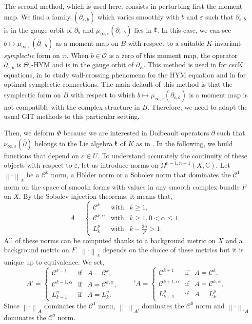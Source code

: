 \documentclass{article}
\theoremstyle{remark}
\theoremstyle{definition}
\newcommand{\C}{\mathbb{C}}
\newcommand{\norme}[1]{\left\| #1 \right\|}
\newcommand{\dbar}{\overline{\partial}}
\newcommand{\mC}{\mathcal{C}}
\renewcommand{\leq}{\leqslant}
\renewcommand{\geq}{\geqslant}
\begin{document}
The second method, which is used here, consists in perturbing first the moment map. We find a family $(\dbar_{\varepsilon,b})$ which varies smoothly with $b$ and $\varepsilon$ such that $\dbar_{\varepsilon,b}$ is in the gauge orbit of $\dbar_b$ and $\mu_{\infty,\varepsilon}(\dbar_{\varepsilon,b})$ lies in $\frak{k}$. In this case, we can see $b \mapsto \mu_{\infty,\varepsilon}(\dbar_{\varepsilon,b})$ as a moment map on $B$ with respect to a suitable $K$-invariant \textit{symplectic} form on it. When $b \in \mathcal{O}$ is a zero of this moment map, the operator $\dbar_{\varepsilon,b}$ is $\Theta_\varepsilon$-HYM and is in the gauge orbit of $\dbar_E$. This method is used in \cite{Gabor} for cscK equations, in \cite{Clarke_Tipler} to study wall-crossing phenomena for the HYM equation and in \cite{Ortu} for optimal symplectic connections. The main default of this method is that the symplectic form on $B$ with respect to which $b \mapsto \mu_{\infty,\varepsilon}(\dbar_{\varepsilon,b})$ is a moment map is not compatible with the complex structure in $B$. Therefore, we need to adapt the usual GIT methods to this particular setting.

Then, we deform $\Phi$ because we are interested in Dolbeault operators $\dbar$ such that $\nu_{\infty,\varepsilon}(\dbar)$ belongs to the Lie algebra $\frak{k}$ of $K$ as in \cite[Proposition 3.2]{Clarke_Tipler}. In the following, we build functions that depend on $\varepsilon \in U$. To understand accurately the continuity of these objects with respect to $\varepsilon$, let us introduce norms on $\Omega^{n - 1,n - 1}(X,\C)$. Let $\norme{\cdot}_A$ be a $\mC^k$ norm, a Hölder norm or a Sobolev norm that dominates the $\mC^1$ norm on the space of smooth forms with values in any smooth complex bundle $F$ on $X$. By the Sobolev injection theorems, it means that,
$$
A = \left\{
\begin{array}{lcl}
    \mC^k & \textrm{with} & k \geq 1,\\
    \mC^{k,\alpha} & \textrm{with} & k \geq 1, 0 < \alpha \leq 1,\\
    L_k^p & \textrm{with} & k - \frac{2n}{p} > 1.
\end{array}
\right.
$$
All of these norms can be computed thanks to a background metric on $X$ and a background metric on $F$. $\norme{\cdot}_A$ depends on the choice of these metrics but it is unique up to equivalence. We set,
$$
A' = \left\{
\begin{array}{lcl}
    \mC^{k - 1} & \textrm{if} & A = \mC^k,\\
    \mC^{k - 1,\alpha} & \textrm{if} & A = \mC^{k,\alpha},\\
    L_{k - 1}^p & \textrm{if} & A = L_k^p.
\end{array}
\right.\qquad
{'\!A} = \left\{
\begin{array}{lcl}
    \mC^{k + 1} & \textrm{if} & A = \mC^k,\\
    \mC^{k + 1,\alpha} & \textrm{if} & A = \mC^{k,\alpha},\\
    L_{k + 1}^p & \textrm{if} & A = L_k^p.
\end{array}
\right.
$$
Since $\norme{\cdot}_A$ dominates the $\mC^1$ norm, $\norme{\cdot}_{A'}$ dominates the $\mC^0$ norm and $\norme{\cdot}_{{'\!A}}$ dominates the $\mC^2$ norm.
\end{document}
